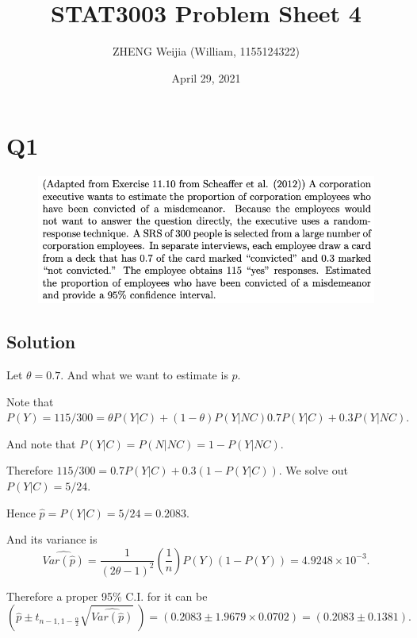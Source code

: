 \documentclass[12pt]{article}%
\begin{document}
\title{STAT3003 Problem Sheet 4}
\author{ZHENG Weijia (William, 1155124322)}
\date{April 29, 2021}
\maketitle


\section{Q1}
\begin{figure}[htp]
    \includegraphics[width = 16cm]{img/Q1.png}
\end{figure}

\subsection*{Solution}

Let $\theta=0.7.$ And what we want to estimate is $p.$

Note that $P(Y)=115/300=\theta P(Y|C)+(1-\theta) P(Y|NC)
0.7 P(Y|C)+0.3 P(Y|NC).$

And note that $P(Y|C)=P(N|NC)=1-P(Y|NC).$

Therefore $115/300 = 0.7 P(Y|C) + 0.3 (1-P(Y|C)).$ We solve out 
$P(Y|C)=5/24.$

Hence $\hat{p}=P(Y|C)=5/24=0.2083.$

And its variance is 
$$\widehat{Var(\hat{p})}=\frac{1}{(2\theta -1)^2}(\frac{1}{n})P(Y)(1-P(Y))=4.9248\times 10^{-3}.$$

Therefore a proper 95\% C.I. for it can be 
$$(\hat{p} \pm t_{n-1,1-\frac{\alpha}{2}} \sqrt{\widehat{Var(\hat{p})}}~)=(0.2083 \pm 1.9679 \times 0.0702)=(0.2083 \pm 0.1381).$$


\newpage
\end{document}
